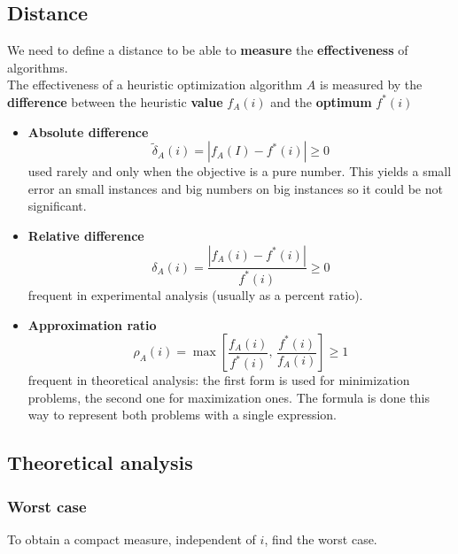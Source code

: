 \documentclass[11pt]{article}
\begin{document}
	\newpage
	
	\subsection{Distance} 
	We need to define a distance to be able to \textbf{measure} the \textbf{effectiveness} of algorithms.\\
	The effectiveness of a heuristic optimization algorithm $A$ is measured by the \textbf{difference} between the heuristic \textbf{value} $f_A (i)$ and the \textbf{optimum} $f^\ast (i)$
	\begin{itemize}
		\item \textbf{Absolute difference}
		$$ \tilde{\delta}_A (i) = |f_A(I) - f^\ast (i)| \geq 0 $$
		used rarely and only when the objective is a pure number. This yields a small error an small instances and big numbers on big instances so it could be not significant.\\
		\item \textbf{Relative difference}
		$$ \delta_A (i) = \frac{|f_A (i) - f^\ast (i)|}{f^\ast (i)} \geq 0$$
		frequent in experimental analysis (usually as a percent ratio).\\
		\item \textbf{Approximation ratio}
		$$ \rho_A (i) = \max \left[\frac{f_A(i)}{f^\ast(i)}, \, \frac{f^\ast (i)}{f_A (i)}\right] \geq 1 $$
		frequent in theoretical analysis: the first form is used for minimization problems, the second one for maximization ones. The formula is done this way to represent both problems with a single expression.\\
	\end{itemize}
	
	\newpage
	
	\subsection{Theoretical analysis}
	\subsubsection{Worst case}
	To obtain a compact measure, independent of $i$, find the worst case.\\
	
\end{document}
